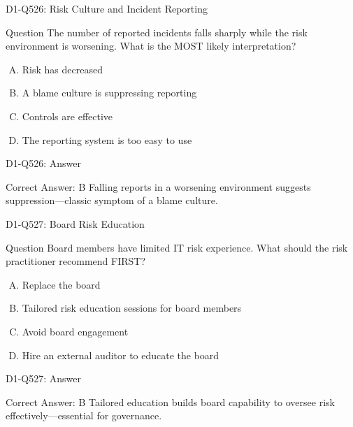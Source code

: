 \documentclass{beamer}
\begin{document}
\begin{frame}{D1-Q526: Risk Culture and Incident Reporting}
	\begin{block}{Question}
		The number of reported incidents falls sharply while the risk environment is worsening. What is the MOST likely interpretation?
	\end{block}
	\begin{enumerate}[(A)]
		\item Risk has decreased
		\item A blame culture is suppressing reporting
		\item Controls are effective
		\item The reporting system is too easy to use
	\end{enumerate}
\end{frame}
\begin{frame}{D1-Q526: Answer}
	\begin{block}{Correct Answer: B}
		Falling reports in a worsening environment suggests suppression—classic symptom of a blame culture.
	\end{block}
\end{frame}

\begin{frame}{D1-Q527: Board Risk Education}
	\begin{block}{Question}
		Board members have limited IT risk experience. What should the risk practitioner recommend FIRST?
	\end{block}
	\begin{enumerate}[(A)]
		\item Replace the board
		\item Tailored risk education sessions for board members
		\item Avoid board engagement
		\item Hire an external auditor to educate the board
	\end{enumerate}
\end{frame}
\begin{frame}{D1-Q527: Answer}
	\begin{block}{Correct Answer: B}
		Tailored education builds board capability to oversee risk effectively—essential for governance.
	\end{block}
\end{frame}
\end{document}
